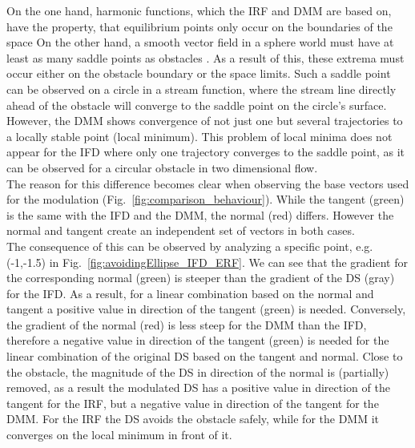On the one hand, harmonic functions, which the IRF and DMM are based on, have the property, that equilibrium points only occur on the boundaries of the space \cite{kim1992real} On the other hand, a smooth vector field in a sphere world must have at least as many saddle points as obstacles \cite{koditschek1990robot}. As a result of this, these extrema must occur either on the obstacle boundary or the space limits. Such a saddle point can be observed on a circle in a stream function, where the stream line directly ahead of the obstacle will converge to the saddle point on the circle's surface. \\
However, the DMM shows convergence of not just one but several trajectories to a locally stable point (local minimum). This problem of local minima does not appear for the IFD where only one trajectory converges to the saddle point, as it can be observed for a circular obstacle in two dimensional flow. \\
The reason for this difference becomes clear when observing the base vectors used for the modulation (Fig.~\ref{fig:comparison_behaviour}). While the tangent (green) is the same with the IFD and the DMM, the normal (red) differs. However the normal and tangent create an independent set of vectors in both cases. \\
The consequence of this can be observed by analyzing a specific point, e.g. (-1,-1.5) in Fig.~\ref{fig:avoidingEllipse_IFD_ERF}. We can see that the gradient for the corresponding normal (green) is steeper than the gradient of the DS (gray) for the IFD. As a result, for a linear combination based on the normal and tangent a positive value in direction of the tangent (green) is needed. Conversely, the gradient of the normal (red) is less steep for the DMM than the IFD, therefore a negative value in direction of the tangent (green) is needed for the linear combination of the original DS based on the tangent and normal. Close to the obstacle, the magnitude of the DS in direction of the normal is (partially) removed, as a result the modulated DS has a positive value in direction of the tangent for the IRF, but a negative value in direction of the tangent for the DMM. For the IRF the DS avoids the obstacle safely, while for the DMM it converges on the local minimum in front of it. \\

